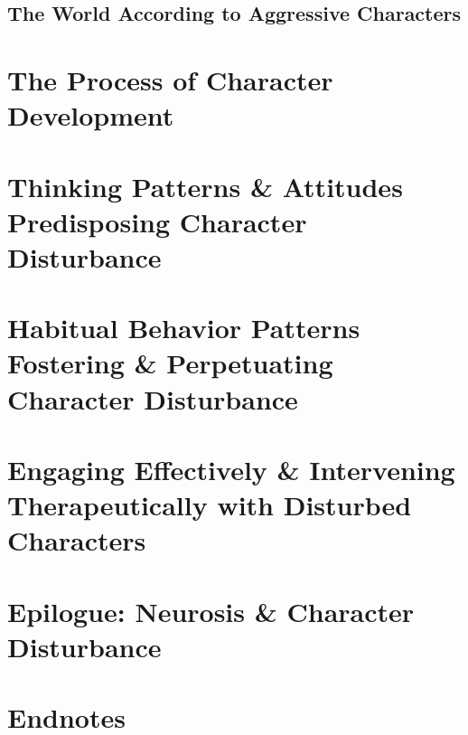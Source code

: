 \documentclass{article}
\numberwithin{equation}{section}
\begin{document}
\subsection{The World According to Aggressive Characters}


\section{The Process of Character Development}


\section{Thinking Patterns \& Attitudes Predisposing Character Disturbance}


\section{Habitual Behavior Patterns Fostering \& Perpetuating Character Disturbance}


\section{Engaging Effectively \& Intervening Therapeutically with Disturbed Characters}


\section{Epilogue: Neurosis \& Character Disturbance}


\section*{Endnotes}


\printbibliography[heading=bibintoc]
	
\end{document}

